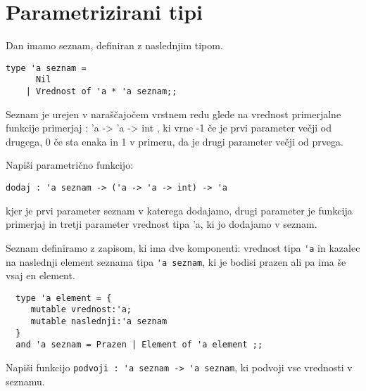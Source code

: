 \section{Parametrizirani tipi}




\begin{ex}
Dan imamo seznam, definiran z naslednjim tipom. 
\begin{lstlisting}
type 'a seznam = 
      Nil 
    | Vrednost of 'a * 'a seznam;; 
\end{lstlisting}

Seznam je urejen v nara\v s\v cajo\v cem vrstnem redu glede na vrednost primerjalne funkcije primerjaj : 'a -> 'a -> int , ki vrne -1 \v ce je prvi parameter ve\v cji od drugega, 0 \v ce sta enaka in 1 v primeru, da je drugi parameter ve\v cji od prvega.

Napi\v si parametri\v cno funkcijo:
\begin{lstlisting}
dodaj : 'a seznam -> ('a -> 'a -> int) -> 'a
\end{lstlisting}
kjer je prvi parameter seznam v katerega dodajamo, drugi parameter je funkcija primerjaj in tretji parameter vrednost tipa 'a, ki jo dodajamo v seznam.
\end{ex}




\begin{ex}
  Seznam definiramo z zapisom, ki ima dve komponenti: vrednost tipa
  \lstinline{'a} in kazalec na naslednji element seznama tipa \lstinline{'a seznam}, ki je bodisi prazen ali pa ima še vsaj en element.

  \begin{lstlisting}
  type 'a element = { 
     mutable vrednost:'a; 
     mutable naslednji:'a seznam 
  }
  and 'a seznam = Prazen | Element of 'a element ;;
  \end{lstlisting}

  Napi\v si funkcijo \lstinline{podvoji : 'a seznam -> 'a seznam}, ki
  podvoji vse vrednosti v seznamu.
\end{ex} 




